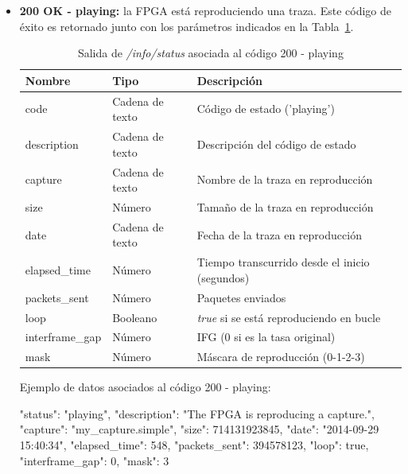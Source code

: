 \begin{itemize}
\item{\textbf{200 OK - playing:} la \gls{FPGA} está reproduciendo una \gls{traza}.
Este código de éxito es retornado junto con los parámetros indicados en la Tabla~\ref{extra:api:infostatus:playing}.
\begin{table}[H]
\centering
\begin{tabular}{|l|l|l|}
\hline
\rowcolor[HTML]{F5F5F5}
\textbf{Nombre}  & \textbf{Tipo}   & \textbf{Descripción}                            \\ \hline
code             & Cadena de texto & Código de estado ('playing')                    \\ \hline
description      & Cadena de texto & Descripción del código de estado                \\ \hline
capture          & Cadena de texto & Nombre de la \gls{traza} en reproducción        \\ \hline
size             & Número          & Tamaño de la \gls{traza} en reproducción        \\ \hline
date             & Cadena de texto & Fecha de la \gls{traza} en reproducción         \\ \hline
elapsed\_time    & Número          & Tiempo transcurrido desde el inicio (segundos)  \\ \hline
packets\_sent    & Número          & Paquetes enviados                               \\ \hline
loop             & Booleano        & \textit{true} si se está reproduciendo en bucle \\ \hline
interframe\_gap  & Número          & \gls{IFG} (0 si es la tasa original)            \\ \hline
mask             & Número          & Máscara de reproducción (0-1-2-3)               \\ \hline
\end{tabular}
\caption{Salida de \textit{/info/status} asociada al código 200 - playing}
\label{extra:api:infostatus:playing}
\end{table}
\begin{minipage}{\textwidth}
Ejemplo de datos asociados al código 200 - playing:

\begin{code}[language=json]
{
  "status": "playing",
  "description": "The FPGA is reproducing a capture.",
  "capture": "my_capture.simple",
  "size": 714131923845,
  "date": "2014-09-29 15:40:34",
  "elapsed_time": 548,
  "packets_sent": 394578123,
  "loop": true,
  "interframe_gap": 0,
  "mask": 3
}
\end{code}
\end{minipage}
}


\end{itemize}
